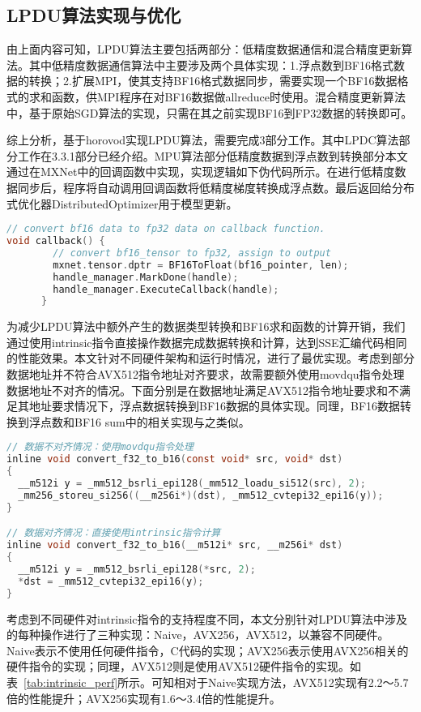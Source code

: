 \subsection{LPDU算法实现与优化}
由上面内容可知，LPDU算法主要包括两部分：低精度数据通信和混合精度更新算法。其中低精度数据通信算法中主要涉及两个具体实现：1.浮点数到BF16格式数据的转换；2.扩展MPI，使其支持BF16格式数据同步，需要实现一个BF16数据格式的求和函数，供MPI程序在对BF16数据做allreduce时使用。混合精度更新算法中，基于原始SGD算法的实现，只需在其之前实现BF16到FP32数据的转换即可。

综上分析，基于horovod实现LPDU算法，需要完成3部分工作。其中LPDC算法部分工作在3.3.1部分已经介绍。MPU算法部分低精度数据到浮点数到转换部分本文通过在MXNet中的回调函数中实现，实现逻辑如下伪代码所示。在进行低精度数据同步后，程序将自动调用回调函数将低精度梯度转换成浮点数。最后返回给分布式优化器DistributedOptimizer用于模型更新。
\begin{lstlisting}[language=C, numbers=none]
// convert bf16 data to fp32 data on callback function.
void callback() {
        // convert bf16_tensor to fp32, assign to output
        mxnet.tensor.dptr = BF16ToFloat(bf16_pointer, len);
        handle_manager.MarkDone(handle);
        handle_manager.ExecuteCallback(handle);
      }
\end{lstlisting}

为减少LPDU算法中额外产生的数据类型转换和BF16求和函数的计算开销，我们通过使用intrinsic指令直接操作数据完成数据转换和计算，达到SSE汇编代码相同的性能效果。本文针对不同硬件架构和运行时情况，进行了最优实现。考虑到部分数据地址并不符合AVX512指令地址对齐要求，故需要额外使用movdqu指令处理数据地址不对齐的情况。下面分别是在数据地址满足AVX512指令地址要求和不满足其地址要求情况下，浮点数据转换到BF16数据的具体实现。同理，BF16数据转换到浮点数和BF16 sum中的相关实现与之类似。

\begin{lstlisting}[language=C, numbers=none]
// 数据不对齐情况：使用movdqu指令处理
inline void convert_f32_to_b16(const void* src, void* dst)
{
  __m512i y = _mm512_bsrli_epi128(_mm512_loadu_si512(src), 2);
  _mm256_storeu_si256((__m256i*)(dst), _mm512_cvtepi32_epi16(y));
}

// 数据对齐情况：直接使用intrinsic指令计算
inline void convert_f32_to_b16(__m512i* src, __m256i* dst)
{
  __m512i y = _mm512_bsrli_epi128(*src, 2);
  *dst = _mm512_cvtepi32_epi16(y);
}
\end{lstlisting}

考虑到不同硬件对intrinsic指令的支持程度不同，本文分别针对LPDU算法中涉及的每种操作进行了三种实现：Naive，AVX256，AVX512，以兼容不同硬件。Naive表示不使用任何硬件指令，C代码的实现；AVX256表示使用AVX256相关的硬件指令的实现；同理，AVX512则是使用AVX512硬件指令的实现。如表~\ref{tab:intrinsic_perf}所示。可知相对于Naive实现方法，AVX512实现有2.2～5.7倍的性能提升；AVX256实现有1.6～3.4倍的性能提升。

